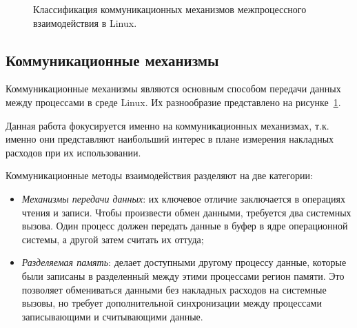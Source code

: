 \documentclass[14pt, russian]{scrartcl}
\begin{document}
\begin{figure}[H]
\begin{minipage}[t]{\textwidth}
  \end{minipage}
  \caption{Классификация коммуникационных механизмов межпроцессного взаимодействия в Linux.}
  \label{fig:communication_ipc_taxonomy}
\end{figure}

\subsection{Коммуникационные механизмы}

Коммуникационные механизмы являются основным способом передачи данных между
процессами в среде Linux. Их разнообразие представлено на
рисунке~\ref{fig:communication_ipc_taxonomy}.

Данная работа фокусируется именно на коммуникационных механизмах, т.к. именно
они представляют наибольший интерес в плане измерения накладных расходов при их
использовании.

Коммуникационные методы взаимодействия разделяют на две
категории:\cite{kerrisk2010linux}

\begin{itemize}
  \item \emph{Механизмы передачи данных}: их ключевое отличие заключается в
        операциях чтения и записи. Чтобы произвести обмен данными, требуется два
        системных вызова. Один процесс должен передать данные в буфер в ядре
        операционной системы, а другой затем считать их оттуда;
  \item \emph{Разделяемая память}: делает доступными другому процессу данные,
        которые были записаны в разделенный между этими процессами регион
        памяти. Это позволяет обмениваться данными без накладных расходов на
        системные вызовы, но требует дополнительной синхронизации между
        процессами записывающими и считывающими данные.
\end{itemize}
\end{document}
